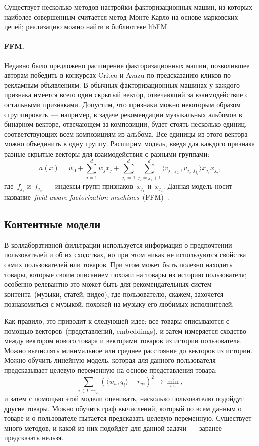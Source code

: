 \documentclass[12pt,fleqn]{article}
\begin{document}
Существует несколько методов настройки факторизационных машин,
из которых наиболее совершенным считается метод Монте-Карло
на основе марковских цепей;
реализацию можно найти в библиотеке libFM.

\paragraph{FFM.}
Недавно было предложено расширение факторизационных машин,
позволившее авторам победить в конкурсах Criteo и Avazu
по предсказанию кликов по рекламным объявлениям.
В обычных факторизационных машинах у каждого признака
имеется всего один скрытый вектор, отвечающий за взаимодействие
с остальными признаками.
Допустим, что признаки можно некоторым образом сгруппировать~---
например, в задаче рекомендации музыкальных альбомов в бинарном векторе,
отвечающем за композиции, будет стоять несколько единиц, соответствующих
всем композициям из альбома.
Все единицы из этого вектора можно объединить в одну группу.
Расширим модель, введя для каждого признака разные скрытые векторы
для взаимодействия с разными группами:
\[
    a(x)
    =
    w_0
    +
    \sum_{j = 1}^{d}
        w_j x_j
    +
    \sum_{j_1 = 1}^{d}
    \sum_{j_2 = j_1 + 1}^{d}
    \langle v_{j_1, f_{j_2}}, v_{j_2, f_{j_1}} \rangle
        x_{j_1} x_{j_2},
\]
где~$f_{j_1}$ и~$f_{j_2}$~--- индексы групп признаков~$x_{j_1}$ и~$x_{j_2}$.
Данная модель носит название~\emph{field-aware factorization machines}~(FFM)~\cite{ffm}.

\subsection{Контентные модели}
В коллаборативной фильтрации используется информация о предпочтении пользователей и об их сходствах,
но при этом никак не используются свойства самих пользователей или товаров.
При этом может быть полезно находить товары, которые своим описанием похожи на товары из историю пользователя;
особенно релевантно это может быть для рекомендательных систем контента~(музыки, статей, видео),
где пользователю, скажем, захочется познакомиться с музыкой, похожей на музыку
его любимых исполнителей.

Как правило, это приводит к следующей идее: все товары описываются с помощью векторов~(представлений, embeddings),
и затем измеряется сходство между вектором нового товара и векторами товаров из истории пользователя.
Можно вычислять минимальное или среднее расстояние до векторов из истории.
Можно обучить линейную модель, которая для данного пользователя предсказывает целевую переменную на основе
представления товара:
\[
    \sum_{i \in I: \exists r_{ui}}
    \left(
        \langle w_u, q_i \rangle
        -
        r_{ui}
    \right)^2
    \to
    \min_{w_u},
\]
и затем с помощью этой модели оценивать, насколько пользователю подойдут другие товары.
Можно обучить граф вычислений, который по всем данным о товаре и о пользователе пытается предсказать
целевую переменную.
Существует много методов, и какой из них подойдёт для данной задачи~--- заранее предсказать нельзя.
\end{document}

